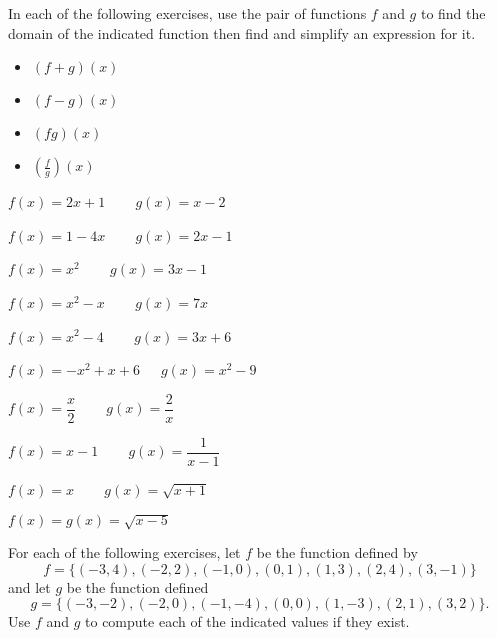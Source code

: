 \documentclass[12pt]{book}
\theoremstyle{definition}
\begin{document}
In each of the following exercises, use the pair of functions $f$ and $g$ to find the domain of the indicated function then find and simplify an expression for it.

\begin{multicols}{4}
\begin{itemize}
\item  $(f+g)(x)$
\item  $(f-g)(x)$
\item  $(fg)(x)$
\item  $\left(\frac{f}{g}\right)(x)$
\end{itemize}
\end{multicols}

\begin{enumerate}[resume]
\begin{multicols}{2}
\item $f(x) = 2x+1$ ~~~ $g(x) = x-2$
\item $f(x) = 1-4x$ ~~~ $g(x) = 2x-1$
\end{multicols}

\begin{multicols}{2}
\item $f(x) = x^2$ ~~~ $g(x) = 3x-1$
\item $f(x) = x^2-x$ ~~~ $g(x) = 7x$
\end{multicols}

\begin{multicols}{2}
\item $f(x) = x^2-4$ ~~~ $g(x) = 3x+6$
\item \mbox{$f(x) = -x^2+x+6$ ~ $g(x) = x^2-9$}
\end{multicols}

\begin{multicols}{2}
\item $f(x) = \dfrac{x}{2}$ ~~~ $g(x) = \dfrac{2}{x}$
\item $f(x) =x-1$ ~~~ $g(x) = \dfrac{1}{x-1}$
\end{multicols}

\begin{multicols}{2}
\item $f(x) = x$ ~~~ $g(x) = \sqrt{x+1}$
\item $f(x) = g(x) = \sqrt{x-5}$
\end{multicols}
\end{enumerate}

For each of the following exercises, let $f$ be the function defined by \[f = \{(-3, 4), (-2, 2), (-1, 0), (0, 1), (1, 3), (2, 4), (3, -1)\}\] and let $g$ be the function defined \[g = \{(-3, -2), (-2, 0), (-1, -4), (0, 0), (1, -3), (2, 1), (3, 2)\}.\] Use $f$ and $g$ to compute each of the indicated values if they exist.
\end{document}
